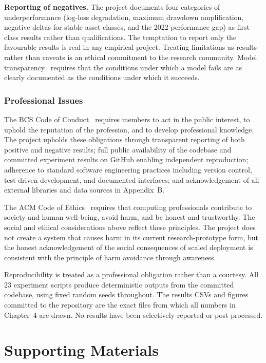 \begin{appendices}
\textbf{Reporting of negatives.} The project documents four categories of underperformance (log-loss degradation, maximum drawdown amplification, negative deltas for stable asset classes, and the 2022 performance gap) as first-class results rather than qualifications. The temptation to report only the favourable results is real in any empirical project. Treating limitations as results rather than caveats is an ethical commitment to the research community. Model transparency~\cite{pasquale2015} requires that the conditions under which a model fails are as clearly documented as the conditions under which it succeeds.

\subsection{Professional Issues}
\label{subsec:professional}

The BCS Code of Conduct~\cite{bcs2022} requires members to act in the public interest, to uphold the reputation of the profession, and to develop professional knowledge. The project upholds these obligations through transparent reporting of both positive and negative results; full public availability of the codebase and committed experiment results on GitHub enabling independent reproduction; adherence to standard software engineering practices including version control, test-driven development, and documented interfaces; and acknowledgement of all external libraries and data sources in Appendix~B.

The ACM Code of Ethics~\cite{acm2018} requires that computing professionals contribute to society and human well-being, avoid harm, and be honest and trustworthy. The social and ethical considerations above reflect these principles. The project does not create a system that causes harm in its current research-prototype form, but the honest acknowledgement of the social consequences of scaled deployment is consistent with the principle of harm avoidance through awareness.

Reproducibility is treated as a professional obligation rather than a courtesy. All 23 experiment scripts produce deterministic outputs from the committed codebase, using fixed random seeds throughout. The results CSVs and figures committed to the repository are the exact files from which all numbers in Chapter~4 are drawn. No results have been selectively reported or post-processed.

\chapter{Supporting Materials}
\label{app:supporting}


\end{appendices}
